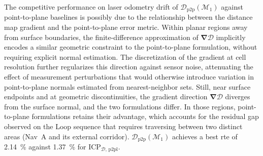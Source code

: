 The competitive performance on laser odometry drift of
$\mathcal{D}_\mathrm{p2p}(\mathcal{M}_1)$ against
point-to-plane baselines is possibly due to the relationship between the
distance map gradient and the point-to-plane error metric. Within planar regions
away from surface boundaries, the finite-difference approximation of
$\bm{\nabla}\mathcal{D}$ implicitly encodes a similar geometric constraint to
the point-to-plane formulation, without requiring explicit normal
estimation. The discretization of the gradient at cell resolution further
regularizes this direction against sensor noise, attenuating the effect of
measurement perturbations that would otherwise introduce variation in
point-to-plane normals estimated from nearest-neighbor sets. Still, near surface
endpoints and at geometric discontinuities, the gradient direction
$\bm{\nabla}\mathcal{D}$ diverges from the surface normal,
and the two formulations differ. In those regions,
point-to-plane formulations retains their advantage, which accounts
for the residual gap observed on the Loop sequence
that requires traversing between two distinct areas
(Nav~A and its external corridor). $\mathcal{D}_\mathrm{p2p}(\mathcal{M}_1)$
achieves a best \gls{rte} of \SI{2.14}{\percent} against \SI{1.37}{\percent} for
$\mathrm{ICP}_{\mathcal{D},\,\mathrm{p2pl}}$.







